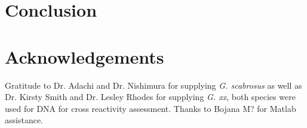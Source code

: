 \documentclass[12pt]{article}
\begin{document}
\section{Conclusion}
\section{Acknowledgements}
Gratitude to Dr. Adachi and Dr. Nishimura for supplying \emph{G. scabrosus} as well as Dr. Kirsty Smith and Dr. Lesley Rhodes for supplying \emph{G. xx}, both species were used for DNA for cross reactivity assessment. Thanks to Bojana M? for Matlab assistance.
\FloatBarrier
\newpage


\end{document}
